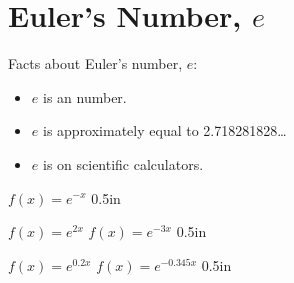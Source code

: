\section{Euler's Number, $e$}

Facts about Euler's number, $e$:\par
\begin{itemize}
    \item $e$ is an  number.
    \item $e$ is approximately equal to 2.718281828\dots
    \item $e$ is on scientific calculators.
\end{itemize}





{
    $f(x) = e^{-x}$
}
{0.5in}

\myProblems
{
    $f(x) = e^{2x}$
}
{
    $f(x) = e^{-3x}$
}
{0.5in}

\myProblems
{
    $f(x) = e^{0.2x}$
}
{
    $f(x) = e^{-0.345x}$
}
{0.5in}



       